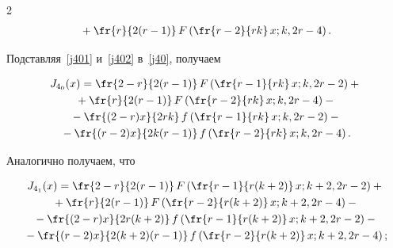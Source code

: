 \begin{multicols}{2}
\begin{multline}
 {}+


\fr{r}{2(r-1)}\,F\left( \fr{r-2}{rk} \,x;k,2r-4\right).


\end{multline}


Подставляя~\eqref{j401} и~\eqref{j402} в~\eqref{j40}, получаем


\begin{multline*}


 J_{4_0}(x) =  \fr{2-r}{2(r-1)}\, F\left( \fr{r-1}{rk}\, x;k,2r-2\right) + {}\\


 {}+


\fr{r}{2(r-1)}\,F\left( \fr{r-2}{rk}\, x;k,2r-4\right) -{} \\


{}-   \fr{(2-r)x}{2rk}\, f\left( \fr{r-1}{rk}\, x;k,2r-2\right) -{}\\


{}- \fr{(r-2)x}{2k(r-1)}\,f\left( \fr{r-2}{rk}\, x;k,2r-4\right).


\end{multline*}





Аналогично получаем, что


\begin{multline*}


 J_{4_1}(x) =  \fr{2-r}{2(r-1)}\,F\left( \fr{r-1}{r(k+2)}\,x;k+2,2r-2\right) 


+ {}\\


{}+\fr{r}{2(r-1)}\,F\left( \fr{r-2}{r(k+2)} \,x;k+2,2r-4\right) -{}\\


{}-   \fr{(2-r)x}{2r(k+2)} \,f\left( \fr{r-1}{r(k+2)}\, x;k+2,2r-2\right)


 -{}\\


 {}- \fr{(r-2)x}{2(k+2)(r-1)}\,f\left( \fr{r-2}{r(k+2)}\,x;k+2,2r-4\right);


 \end{multline*}


 


 \vspace*{-12pt}


 


 \noindent


 \begin{multline*}



\end{multline*}
\end{multicols}
